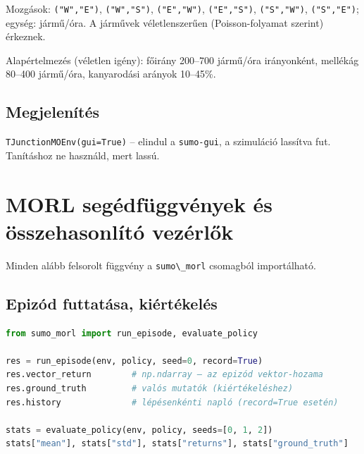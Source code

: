 Mozgások:
\passthrough{\lstinline!("W","E")!},
\passthrough{\lstinline!("W","S")!},
\passthrough{\lstinline!("E","W")!},
\passthrough{\lstinline!("E","S")!},
\passthrough{\lstinline!("S","W")!},
\passthrough{\lstinline!("S","E")!};
egység: jármű/óra. A járművek
véletlenszerűen (Poisson-folyamat
szerint) érkeznek.

Alapértelmezés (véletlen igény): főirány
200--700 jármű/óra irányonként, mellékág
80--400 jármű/óra, kanyarodási arányok
10--45\%.

\hypertarget{megjelenuxedtuxe9s}{%
\subsection{Megjelenítés}\label{megjelenuxedtuxe9s}}

\passthrough{\lstinline!TJunctionMOEnv(gui=True)!}
-- elindul a
\passthrough{\lstinline!sumo-gui!}, a
szimuláció lassítva fut. Tanításhoz ne
használd, mert lassú.


\hypertarget{morl-seguxe9dfuxfcggvuxe9nyek-uxe9s-uxf6sszehasonluxedtuxf3-vezuxe9rlux151k}{%
\section{MORL segédfüggvények és
összehasonlító
vezérlők}\label{morl-seguxe9dfuxfcggvuxe9nyek-uxe9s-uxf6sszehasonluxedtuxf3-vezuxe9rlux151k}}

Minden alább felsorolt függvény a
\passthrough{\lstinline!sumo\_morl!}
csomagból importálható.

\hypertarget{epizuxf3d-futtatuxe1sa-kiuxe9rtuxe9keluxe9s}{%
\subsection{Epizód futtatása,
kiértékelés}\label{epizuxf3d-futtatuxe1sa-kiuxe9rtuxe9keluxe9s}}

\begin{lstlisting}[language=Python]
from sumo_morl import run_episode, evaluate_policy

res = run_episode(env, policy, seed=0, record=True)
res.vector_return        # np.ndarray – az epizód vektor-hozama
res.ground_truth         # valós mutatók (kiértékeléshez)
res.history              # lépésenkénti napló (record=True esetén)

stats = evaluate_policy(env, policy, seeds=[0, 1, 2])
stats["mean"], stats["std"], stats["returns"], stats["ground_truth"]
\end{lstlisting}

